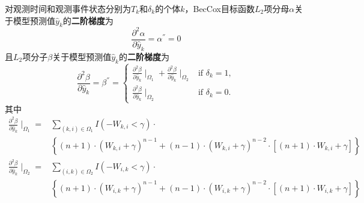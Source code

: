 \begin{theorem}\label{thm:2.4}
对观测时间和观测事件状态分别为$T_k$和$\delta_k$的个体$k$，BecCox目标函数$L_2$项分母$\alpha$关于模型预测值$\hat{y}_k$的\textbf{二阶梯度}为$$
\frac{\partial^2 \alpha}{\partial \hat{y}_k}=\alpha^{''}=0
$$ 且$L_2$项分子$\beta$关于模型预测值$\hat{y}_k$的\textbf{二阶梯度}为$$
\frac{\partial^2 \beta}{\partial \hat{y}_k}=\beta^{''}=
\begin{cases}
\frac{\partial^2 \beta}{\partial \hat{y}_k} \mid_{\Omega_1} + \frac{\partial^2 \beta}{\partial \hat{y}_k} \mid_{\Omega_2} & \text{if } \delta_k = 1,\\
\frac{\partial^2 \beta}{\partial \hat{y}_k} \mid_{\Omega_2} & \text{if } \delta_k = 0.
\end{cases}
$$ 其中\[
\begin{split}
\frac{\partial^2 \beta}{\partial \hat{y}_k} \mid_{\Omega_1} =& \sum\limits_{(k,i)\in \Omega_1} I(-W_{k,i}<\gamma)\cdot \\
  & \left\{(n+1)\cdot (W_{k,i}+\gamma)^{n-1} + (n-1)\cdot (W_{k,i}+\gamma)^{n-2}\cdot [(n+1)\cdot W_{k,i}+\gamma]\right\} \\
\frac{\partial^2 \beta}{\partial \hat{y}_k} \mid_{\Omega_2} =& \sum\limits_{(i,k)\in \Omega_2} I(-W_{i,k}<\gamma)\cdot \\
  & \left\{(n+1)\cdot (W_{i,k}+\gamma)^{n-1} + (n-1)\cdot (W_{i,k}+\gamma)^{n-2}\cdot [(n+1)\cdot W_{i,k}+\gamma]\right\}
\end{split}
\]
\end{theorem}

